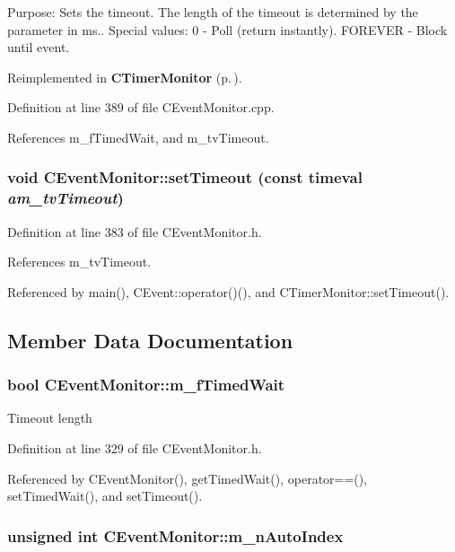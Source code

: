 Purpose: Sets the timeout. The length of the timeout is determined by the parameter in ms..  Special values: 0 - Poll (return instantly). FOREVER - Block until event. 

Reimplemented in {\bf CTimer\-Monitor} {\rm (p.\,\pageref{classCTimerMonitor_a9})}.

Definition at line 389 of file CEvent\-Monitor.cpp.

References m\_\-f\-Timed\-Wait, and m\_\-tv\-Timeout.
\subsubsection{\setlength{\rightskip}{0pt plus 5cm}void CEvent\-Monitor::set\-Timeout (const timeval {\em am\_\-tv\-Timeout})\hspace{0.3cm}{\tt  [inline, protected]}}\label{classCEventMonitor_b0}




Definition at line 383 of file CEvent\-Monitor.h.

References m\_\-tv\-Timeout.

Referenced by main(), CEvent::operator()(), and CTimer\-Monitor::set\-Timeout().

\subsection{Member Data Documentation}
\subsubsection{\setlength{\rightskip}{0pt plus 5cm}bool CEvent\-Monitor::m\_\-f\-Timed\-Wait\hspace{0.3cm}{\tt  [private]}}\label{classCEventMonitor_o1}


Timeout length 

Definition at line 329 of file CEvent\-Monitor.h.

Referenced by CEvent\-Monitor(), get\-Timed\-Wait(), operator==(), set\-Timed\-Wait(), and set\-Timeout().
\subsubsection{\setlength{\rightskip}{0pt plus 5cm}unsigned int CEvent\-Monitor::m\_\-n\-Auto\-Index\hspace{0.3cm}{\tt  [static, private]}}\label{classCEventMonitor_r0}


